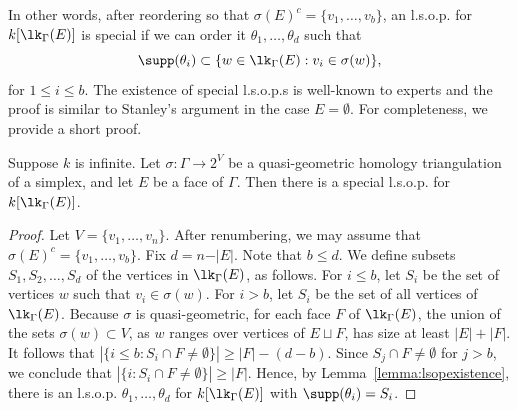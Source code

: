 In other words, after reordering so that $\sigma(E)^c = \{v_1, \ldots, v_b\}$, an l.s.o.p. for $k[\lk_\Gamma(E)]$ is special if we can order it $\theta_1, \ldots, \theta_d$ such that
\[
\supp(\theta_i) \subset \{ w \in \lk_\Gamma(E) : v_i \in \sigma(w)\},
\]
for $1 \leq i \leq b$.  The existence of special l.s.o.p.s is well-known to experts and the proof is similar to Stanley's argument in the case $E = \emptyset$. For completeness, we provide a short proof.

\begin{proposition} \label{prop:speciallsopexistence}
Suppose $k$ is infinite. Let $\sigma\colon \Gamma \to 2^V$ be a quasi-geometric homology triangulation of a simplex, and let $E$ be a face of $\Gamma$. Then there is a special l.s.o.p. for $k[\lk_{\Gamma}(E)]$.
\end{proposition}
\begin{proof}

Let $V = \{v_1, \ldots, v_n\}$.  After renumbering, we may assume that $\sigma(E)^c = \{v_1, \dotsc, v_b\}$. Fix $d = n - \vert E \vert$. Note that $b \leq d$.  We define subsets $S_1, S_2, \dotsc, S_{d}$ of the vertices in $\lk_{\Gamma}(E)$, as follows. For $i \le b$, let $S_i$ be the set of vertices $w$ such that $v_i \in \sigma(w)$. 
For $i > b$, let $S_i$ be the set of all vertices of $\lk_{\Gamma}(E)$. Because $\sigma$ is quasi-geometric, for each face $F$ of $\lk_{\Gamma}(E)$, the union of the sets $\sigma(w) \subset V$, as $w$ ranges over vertices of $E \sqcup F$, has size at least $|E| + |F|$.  It follows that $|\{i \leq b : S_i \cap F \neq \emptyset \}| \geq |F| - (d-b)$.  Since $S_j \cap F \neq \emptyset$ for $j > b$, we conclude that $|\{i : S_i \cap F \neq \emptyset \}| \geq |F|$.  Hence, by Lemma~\ref{lemma:lsopexistence}, there is an l.s.o.p. $\theta_1, \ldots, \theta_d$ for $k[\lk_\Gamma(E)]$ with $\supp(\theta_i) = S_i$. 
\end{proof}
